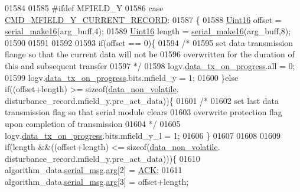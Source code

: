 \begin{DoxyCode}
{{{{{01584 
01585 \textcolor{preprocessor}{#ifdef MFIELD\_Y}
01586                   \textcolor{keywordflow}{case}  \hyperlink{a00021_a8ddac7f7a2a90f2d8535af02e338b1bf}{CMD\_MFIELD\_Y\_CURRENT\_RECORD}:
01587                 \{
01588                     \hyperlink{a00072_a59a9f6be4562c327cbfb4f7e8e18f08b}{Uint16} offset = \hyperlink{a00031_abc17de32f14103a5be219df0d4ad9176}{serial\_make16}(arg\_buff,4);
01589                     \hyperlink{a00072_a59a9f6be4562c327cbfb4f7e8e18f08b}{Uint16} length = \hyperlink{a00031_abc17de32f14103a5be219df0d4ad9176}{serial\_make16}(arg\_buff,8);
01590 
01591 
01592 
01593                     \textcolor{keywordflow}{if}(offset == 0)\{
01594                         \textcolor{comment}{/*}
01595 \textcolor{comment}{                         set data transmission flange so that the current data will not be}
01596 \textcolor{comment}{                         overwritten for the duration of this and subsequent transfer}
01597 \textcolor{comment}{                       */}
01598                         logv.\hyperlink{a00021_a6cdefde69642ef511e3252c38be68516}{data\_tx\_on\_progress}.all             = 0;
01599                         logv.\hyperlink{a00021_a6cdefde69642ef511e3252c38be68516}{data\_tx\_on\_progress}.bits.mfield\_y   = 1;
01600                     \}\textcolor{keywordflow}{else} \textcolor{keywordflow}{if}((offset+length) >= \textcolor{keyword}{sizeof}(\hyperlink{a00060_a76ac5f917f5308dcd83de0d7c94559fb}{data\_non\_volatile}.
      disturbance\_record.mfield\_y.pre\_act\_data))\{
01601                         \textcolor{comment}{/*}
01602 \textcolor{comment}{                         set last data transmission flag so that serial module clears}
01603 \textcolor{comment}{                         overwrite protection flag upon completion of transmission}
01604 \textcolor{comment}{                       */}
01605                         logv.\hyperlink{a00021_a6cdefde69642ef511e3252c38be68516}{data\_tx\_on\_progress}.bits.mfield\_y\_l = 1;
01606                     \}
01607 
01608 
01609                    \textcolor{keywordflow}{if}(length &&((offset+length) <= \textcolor{keyword}{sizeof}(\hyperlink{a00060_a76ac5f917f5308dcd83de0d7c94559fb}{data\_non\_volatile}.
      disturbance\_record.mfield\_y.pre\_act\_data)))\{
01610                        algorithm\_data.\hyperlink{a00016_afcf5f557aea688aad985eec15269c1da}{serial\_msg}.\hyperlink{a00031_af7d6f762438c80072bd9dc0e4dd4ae1e}{arg}[2]                 = 
      \hyperlink{a00021_a6f6489887e08bff4887d0bc5dcf214d8}{ACK};
01611                        algorithm\_data.\hyperlink{a00016_afcf5f557aea688aad985eec15269c1da}{serial\_msg}.\hyperlink{a00031_af7d6f762438c80072bd9dc0e4dd4ae1e}{arg}[3]                 = offset+length;
}}}}}
\end{DoxyCode}
